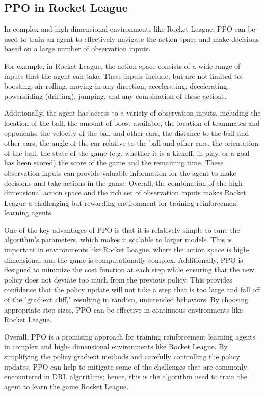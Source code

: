 \documentclass[10pt,twocolumn]{article}
\begin{document}
\subsection{PPO in Rocket League}
 In complex and high-dimensional environments like Rocket League, PPO can be used to train an agent to 
 effectively navigate the action space and make decisions based on a large number of observation inputs.

 For example, in Rocket League, the action space consists of a wide range of inputs that the agent can 
 take. These inputs include, but are not limited to: boosting, air-rolling, moving in any direction, 
 accelerating, decelerating, powersliding (drifting), jumping, and any combination of these actions.

 Additionally, the agent has access to a variety of observation inputs, including the location of the 
 ball, the amount of boost available, the location of teammates and opponents, the velocity of the ball 
 and other cars, the distance to the ball and other cars, the angle of the car relative to the ball and 
 other cars, the orientation of the ball, the state of the game (e.g. whether it is a kickoff, in play, or 
 a goal has been scored) the score of the game and the remaining time. These observation inputs can 
 provide valuable information for the agent to make decisions and take actions in the game. Overall, the 
 combination of the high-dimensional action space and the rich set of observation inputs makes Rocket 
 League a challenging but rewarding environment for training reinforcement learning agents.

 One of the key advantages of PPO is that it is relatively simple to tune the algorithm's parameters, 
 which makes it scalable to larger models. This is important in environments like Rocket League, where the 
 action space is high-dimensional and the game is computationally complex. Additionally, PPO is designed 
 to minimize the cost function at each step while ensuring that the new policy does not deviate too much 
 from the previous policy. This provides confidence that the policy update will not take a step that is 
 too large and fall off of the "gradient cliff," resulting in random, unintended behaviors. By choosing 
 appropriate step sizes, PPO can be effective in continuous environments like Rocket League.

 Overall, PPO is a promising approach for training reinforcement learning agents in complex and high-
 dimensional environments like Rocket League. By simplifying the policy gradient methods and carefully 
 controlling the policy updates, PPO can help to mitigate some of the challenges that are commonly 
 encountered in DRL algorithms; hence, this is the algorithm used to train the agent to learn the game 
 Rocket League.
\end{document}
